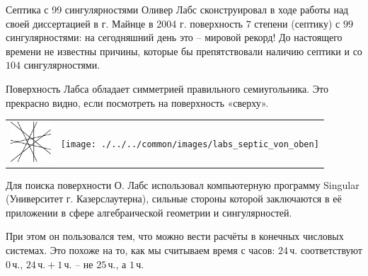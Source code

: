 \begin{surferPage}[Лабс]{Септика с 99 сингулярностями}
Оливер Лабс сконструировал в ходе работы над своей диссертацией в г. Майнце в 2004 г. поверхность $7$ степени (септику) с $99$ сингулярностями: на сегодняшний день это – мировой рекорд! До настоящего времени не известны причины, которые бы препятствовали наличию септики и со $104$ сингулярностями. 

Поверхность Лабса обладает симметрией правильного семиугольника. Это прекрасно видно, если посмотреть на поверхность «сверху». 
    \vspace*{-0.3em}
    \begin{center}
      \begin{tabular}{c@{\qquad}c}
        \includegraphics[height=1.5cm]{./../../common/images/labsseptic1.pdf}
        &
        \texttt{[image: ./../../common/images/labs\_septic\_von\_oben]}
      \end{tabular}
    \end{center}
    \vspace*{-0.3em}

Для поиска поверхности О. Лабс использовал компьютерную программу Singular (Университет г. Казерслаутерна), сильные стороны которой заключаются в её приложении в сфере алгебраической геометрии и сингулярностей.

При этом он пользовался тем, что можно вести расчёты в конечных числовых системах. Это похоже на то, как мы считываем время с часов: $24\,$ч. соответствуют $0\,$ч., $24\,\text{ч}. + 1\,$ч. – не $25\,$ч., а $1\,$ч.
\end{surferPage}
